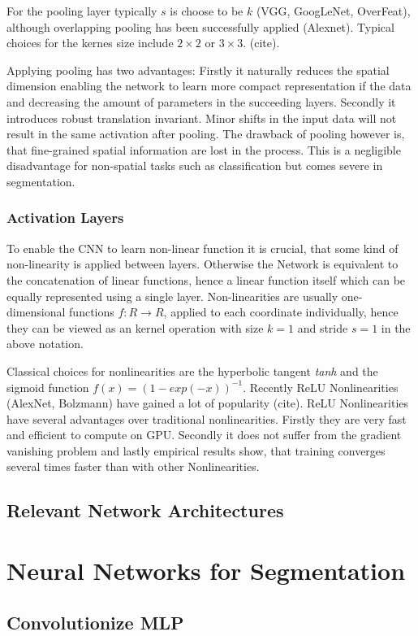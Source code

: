 For the pooling layer typically $s$ is choose to be $k$ (VGG, GoogLeNet, OverFeat),  although overlapping pooling has been successfully applied (Alexnet). Typical choices for the kernes size include $2 \times 2$ or $3 \times 3$. (cite).

Applying pooling has two  advantages: Firstly it naturally reduces the spatial dimension enabling the network to learn more compact representation if the data and decreasing the amount of parameters in the succeeding layers. Secondly it introduces robust translation invariant. Minor shifts in the input data will not result in the same activation after pooling. The drawback of pooling however is, that fine-grained spatial information are lost in the process. This is a negligible disadvantage for non-spatial tasks such as classification but comes severe in segmentation. 

 \subsubsection{Activation Layers}
 
 To enable the CNN to learn non-linear function it is crucial, that some kind of non-linearity is applied between layers. Otherwise the Network is equivalent to the concatenation of linear functions, hence a linear function itself which can be equally represented using a single layer. Non-linearities are usually one-dimensional functions $f: R \rightarrow R$, applied to each coordinate individually, hence they can be viewed as an kernel operation with size $k=1$ and stride $s=1$ in the above notation. 
 
Classical choices for nonlinearities are the hyperbolic tangent \emph{tanh} and the sigmoid function $f(x) = (1- exp(-x))^{-1}$. Recently ReLU Nonlinearities (AlexNet, Bolzmann) have gained a lot of popularity (cite). ReLU Nonlinearities have several advantages over traditional nonlinearities. Firstly they are very fast and efficient to compute on GPU. Secondly it does not suffer from the gradient vanishing problem and lastly empirical results show, that training converges several times faster than with other Nonlinearities.
 

\subsection{Relevant Network Architectures}





\section{Neural Networks for Segmentation}


\subsection{Convolutionize MLP}

\clearpage